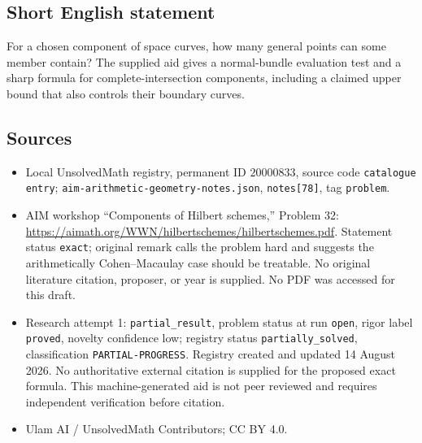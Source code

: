 \documentclass[11pt]{article}
\begin{document}
\subsection{Short English statement}
For a chosen component of space curves, how many general points can some member contain? The supplied aid gives a normal-bundle evaluation test and a sharp formula for complete-intersection components, including a claimed upper bound that also controls their boundary curves.
\subsection{Sources}
\begin{itemize}
\item Local UnsolvedMath registry, permanent ID \(20000833\), source code \texttt{catalogue entry}; \texttt{aim-arithmetic-geometry-notes.json}, \texttt{notes[78]}, tag \texttt{problem}.
\item AIM workshop ``Components of Hilbert schemes,'' Problem 32: \url{https://aimath.org/WWN/hilbertschemes/hilbertschemes.pdf}. Statement status \texttt{exact}; original remark calls the problem hard and suggests the arithmetically Cohen--Macaulay case should be treatable. No original literature citation, proposer, or year is supplied. No PDF was accessed for this draft.
\item Research attempt 1: \texttt{partial\_result}, problem status at run \texttt{open}, rigor label \texttt{proved}, novelty confidence low; registry status \texttt{partially\_solved}, classification \texttt{PARTIAL-PROGRESS}. Registry created and updated 14 August 2026. No authoritative external citation is supplied for the proposed exact formula. This machine-generated aid is not peer reviewed and requires independent verification before citation.
\item Ulam AI / UnsolvedMath Contributors; CC BY 4.0.
\end{itemize}
\end{document}
